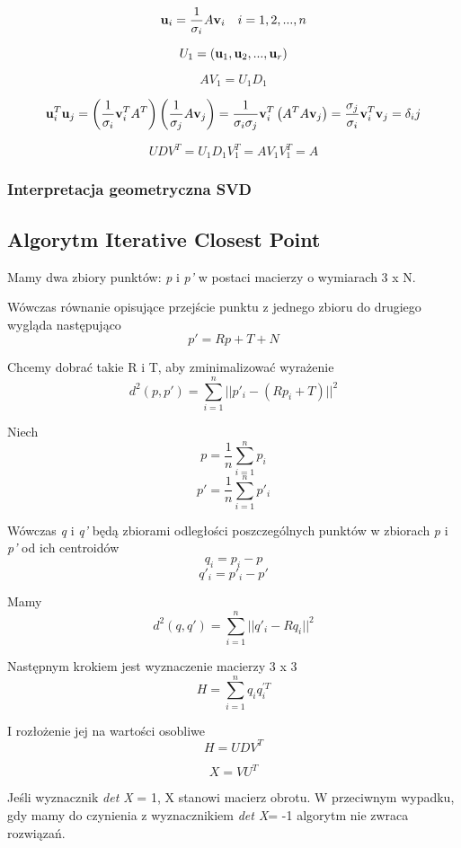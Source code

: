 \documentclass[12pt]{article}
\begin{document}
\[\vb{u}_i = \frac{1}{\sigma_i}A \vb{v}_i \quad i = 1, 2,..., n \]

\[U_1 = (\vb{u}_1, \vb{u}_2,..., \vb{u}_r) \]

\[AV_1 = U_1 D_1 \]

\[\vb{u}_i^T \vb{u}_j = \left(\frac{1}{\sigma_i}\vb{v}_i^T A^T \right) \left(\frac{1}{\sigma_j}A \vb{v}_j \right)
= \frac{1}{\sigma_i \sigma_j}\vb{v}_i^T \left( A^T A \vb{v}_j \right)
= \frac{\sigma_j}{\sigma_i} \vb{v}_i^T \vb{v}_j 
= \delta_ij \]

\[UDV^T = U_1 D_1 V_1^T = AV_1 V_1^T = A \]

\subsubsection{Interpretacja geometryczna SVD}

\subsection{Algorytm Iterative Closest Point}
Mamy dwa zbiory punktów: \emph{p} i \emph{p'} w postaci macierzy o wymiarach 3 x N.

Wówczas równanie opisujące przejście punktu z jednego zbioru do drugiego wygląda następująco
\[p' = R p + T + N \]

Chcemy dobrać takie R i T, aby zminimalizować wyrażenie
\[ d^2(p, p') = \sum_{i=1}^n || p'_{i} - (Rp_i+T)||^2 \]

Niech 
\[p = \frac{1}{n} \sum_{i=1}^n p_i \]
\[p' = \frac{1}{n} \sum_{i=1}^n p'_i \]

Wówczas \emph{q} i \emph{q'} będą zbiorami odległości poszczególnych punktów w zbiorach \emph{p} i \emph{p'} od ich centroidów
\[q_i = p_i - p \]
\[q'_{i} = p'_{i} - p' \]

Mamy
\[d^2(q, q') = \sum_{i=1}^n || q'_{i} - Rq_{i}||^2 \]

Następnym krokiem jest wyznaczenie macierzy 3 x 3 
\[H = \sum_{i=1}^n q_{i} q_{i}^{'T} \]

I rozłożenie jej na wartości osobliwe
\[H = UDV^T \]

\[X = VU^T \]

Jeśli wyznacznik \emph{det X} = 1, X stanowi macierz obrotu. W przeciwnym wypadku, gdy mamy do czynienia z wyznacznikiem \emph{det X}= -1 algorytm nie zwraca rozwiązań. 
\end{document}
